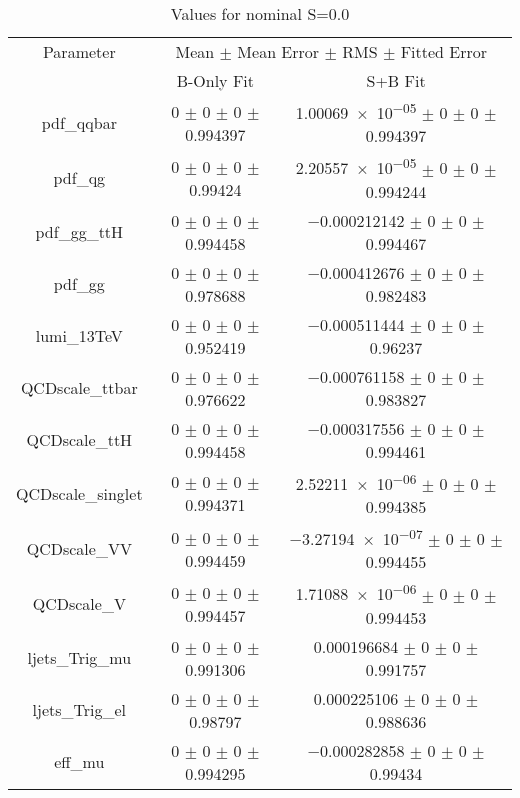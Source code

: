 \begin{table}
\centering
\caption{Values for nominal S=0.0}
\begin{tabular}{ccc}
\toprule
Parameter & \multicolumn{2}{c}{Mean $\pm$ Mean Error $\pm$ RMS $\pm$ Fitted Error}\\
 & B-Only Fit & S+B Fit\\
\midrule
pdf\_qqbar & \num{0} $\pm$ \num{0} $\pm$ \num{0} $\pm$ \num{0.994397} & \num{1.00069e-05} $\pm$ \num{0} $\pm$ \num{0} $\pm$ \num{0.994397}\\
pdf\_qg & \num{0} $\pm$ \num{0} $\pm$ \num{0} $\pm$ \num{0.99424} & \num{2.20557e-05} $\pm$ \num{0} $\pm$ \num{0} $\pm$ \num{0.994244}\\
pdf\_gg\_ttH & \num{0} $\pm$ \num{0} $\pm$ \num{0} $\pm$ \num{0.994458} & \num{-0.000212142} $\pm$ \num{0} $\pm$ \num{0} $\pm$ \num{0.994467}\\
pdf\_gg & \num{0} $\pm$ \num{0} $\pm$ \num{0} $\pm$ \num{0.978688} & \num{-0.000412676} $\pm$ \num{0} $\pm$ \num{0} $\pm$ \num{0.982483}\\
lumi\_13TeV & \num{0} $\pm$ \num{0} $\pm$ \num{0} $\pm$ \num{0.952419} & \num{-0.000511444} $\pm$ \num{0} $\pm$ \num{0} $\pm$ \num{0.96237}\\
QCDscale\_ttbar & \num{0} $\pm$ \num{0} $\pm$ \num{0} $\pm$ \num{0.976622} & \num{-0.000761158} $\pm$ \num{0} $\pm$ \num{0} $\pm$ \num{0.983827}\\
QCDscale\_ttH & \num{0} $\pm$ \num{0} $\pm$ \num{0} $\pm$ \num{0.994458} & \num{-0.000317556} $\pm$ \num{0} $\pm$ \num{0} $\pm$ \num{0.994461}\\
QCDscale\_singlet & \num{0} $\pm$ \num{0} $\pm$ \num{0} $\pm$ \num{0.994371} & \num{2.52211e-06} $\pm$ \num{0} $\pm$ \num{0} $\pm$ \num{0.994385}\\
QCDscale\_VV & \num{0} $\pm$ \num{0} $\pm$ \num{0} $\pm$ \num{0.994459} & \num{-3.27194e-07} $\pm$ \num{0} $\pm$ \num{0} $\pm$ \num{0.994455}\\
QCDscale\_V & \num{0} $\pm$ \num{0} $\pm$ \num{0} $\pm$ \num{0.994457} & \num{1.71088e-06} $\pm$ \num{0} $\pm$ \num{0} $\pm$ \num{0.994453}\\
ljets\_Trig\_mu & \num{0} $\pm$ \num{0} $\pm$ \num{0} $\pm$ \num{0.991306} & \num{0.000196684} $\pm$ \num{0} $\pm$ \num{0} $\pm$ \num{0.991757}\\
ljets\_Trig\_el & \num{0} $\pm$ \num{0} $\pm$ \num{0} $\pm$ \num{0.98797} & \num{0.000225106} $\pm$ \num{0} $\pm$ \num{0} $\pm$ \num{0.988636}\\
eff\_mu & \num{0} $\pm$ \num{0} $\pm$ \num{0} $\pm$ \num{0.994295} & \num{-0.000282858} $\pm$ \num{0} $\pm$ \num{0} $\pm$ \num{0.99434}\\

\end{tabular}
\end{table}
